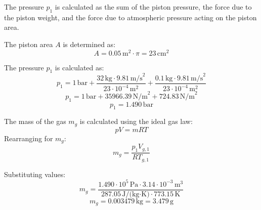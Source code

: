 The pressure \( p_1 \) is calculated as the sum of the piston pressure, the force due to the piston weight, and the force due to atmospheric pressure acting on the piston area.  

The piston area \( A \) is determined as:  
\[
A = 0.05 \, \text{m}^2 \cdot \pi = 23 \, \text{cm}^2
\]  

The pressure \( p_1 \) is calculated as:  
\[
p_1 = 1 \, \text{bar} + \frac{32 \, \text{kg} \cdot 9.81 \, \text{m/s}^2}{23 \cdot 10^{-4} \, \text{m}^2} + \frac{0.1 \, \text{kg} \cdot 9.81 \, \text{m/s}^2}{23 \cdot 10^{-4} \, \text{m}^2}
\]  
\[
p_1 = 1 \, \text{bar} + 35966.39 \, \text{N/m}^2 + 724.83 \, \text{N/m}^2
\]  
\[
p_1 = 1.490 \, \text{bar}
\]  

The mass of the gas \( m_g \) is calculated using the ideal gas law:  
\[
p V = m R T
\]  
Rearranging for \( m_g \):  
\[
m_g = \frac{p_1 V_{g,1}}{R T_{g,1}}
\]  

Substituting values:  
\[
m_g = \frac{1.490 \cdot 10^5 \, \text{Pa} \cdot 3.14 \cdot 10^{-3} \, \text{m}^3}{287.05 \, \text{J/(kg·K)} \cdot 773.15 \, \text{K}}
\]  
\[
m_g = 0.003479 \, \text{kg} = 3.479 \, \text{g}
\]